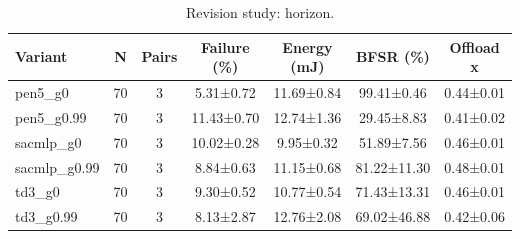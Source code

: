 \begin{table}[t]
\centering
\caption{Revision study: horizon.}
\label{tab:rev_horizon}
\footnotesize
\setlength{\tabcolsep}{3pt}
\begin{tabular}{lcccccc}
\hline
Variant & N & Pairs & Failure (\%) & Energy (mJ) & BFSR (\%) & Offload x \\
\hline
pen5\_g0 & 70 & 3 & 5.31±0.72 & 11.69±0.84 & 99.41±0.46 & 0.44±0.01 \\
pen5\_g0.99 & 70 & 3 & 11.43±0.70 & 12.74±1.36 & 29.45±8.83 & 0.41±0.02 \\
sacmlp\_g0 & 70 & 3 & 10.02±0.28 & 9.95±0.32 & 51.89±7.56 & 0.46±0.01 \\
sacmlp\_g0.99 & 70 & 3 & 8.84±0.63 & 11.15±0.68 & 81.22±11.30 & 0.48±0.01 \\
td3\_g0 & 70 & 3 & 9.30±0.52 & 10.77±0.54 & 71.43±13.31 & 0.46±0.01 \\
td3\_g0.99 & 70 & 3 & 8.13±2.87 & 12.76±2.08 & 69.02±46.88 & 0.42±0.06 \\
\hline
\end{tabular}
\end{table}
